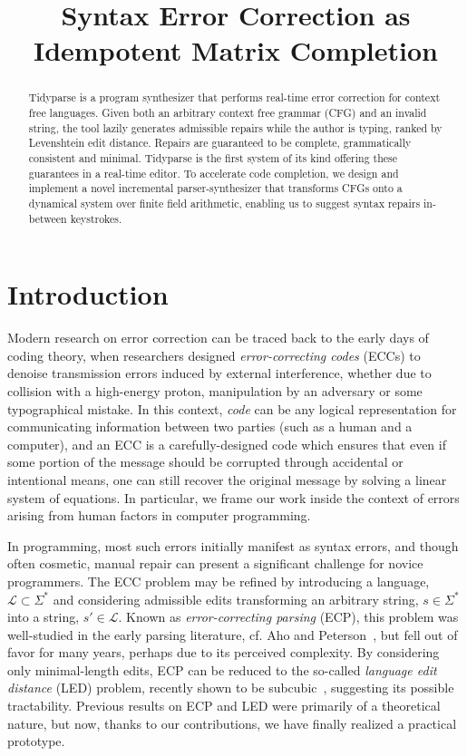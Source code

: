 \documentclass[sigplan,review,anonymous,acmsmall]{acmart}\settopmatter{printfolios=false,printccs=false,printacmref=false}
\begin{document}
    \title{Syntax Error Correction as Idempotent Matrix Completion}
    \begin{abstract}
        Tidyparse is a program synthesizer that performs real-time error correction for context free languages.
        Given both an arbitrary context free grammar (CFG) and an invalid string, the tool lazily generates admissible repairs while the author is typing, ranked by Levenshtein edit distance.
        Repairs are guaranteed to be complete, grammatically consistent and minimal.
        Tidyparse is the first system of its kind offering these guarantees in a real-time editor. To accelerate code completion, we design and implement a novel incremental parser-synthesizer that transforms CFGs onto a dynamical system over finite field arithmetic, enabling us to suggest syntax repairs in-between keystrokes.
    \end{abstract}


    \maketitle

    \section{Introduction}

    Modern research on error correction can be traced back to the early days of coding theory, when researchers designed \textit{error-correcting codes} (ECCs) to denoise transmission errors induced by external interference, whether due to collision with a high-energy proton, manipulation by an adversary or some typographical mistake. In this context, \textit{code} can be any logical representation for communicating information between two parties (such as a human and a computer), and an ECC is a carefully-designed code which ensures that even if some portion of the message should be corrupted through accidental or intentional means, one can still recover the original message by solving a linear system of equations. In particular, we frame our work inside the context of errors arising from human factors in computer programming.

    In programming, most such errors initially manifest as syntax errors, and though often cosmetic, manual repair can present a significant challenge for novice programmers. The ECC problem may be refined by introducing a language, $\mathcal{L} \subset \Sigma^*$ and considering admissible edits transforming an arbitrary string, $s \in \Sigma^*$ into a string, $s'\in\mathcal{L}$. Known as \textit{error-correcting parsing} (ECP), this problem was well-studied in the early parsing literature, cf. Aho and Peterson~\cite{aho1972minimum}, but fell out of favor for many years, perhaps due to its perceived complexity. By considering only minimal-length edits, ECP can be reduced to the so-called \textit{language edit distance} (LED) problem, recently shown to be subcubic~\cite{bringmann2019truly}, suggesting its possible tractability. Previous results on ECP and LED were primarily of a theoretical nature, but now, thanks to our contributions, we have finally realized a practical prototype.
\end{document}
